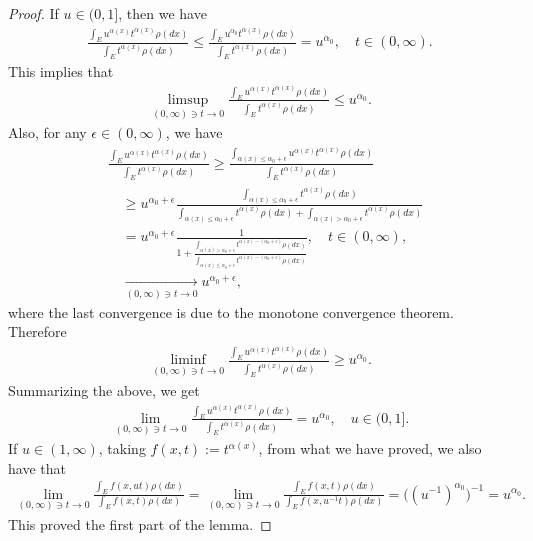 \documentclass[12pt,a4paper]{amsart}
\theoremstyle{definition}
\numberwithin{equation}{section}
\begin{document}
\begin{proof}
	If $u \in (0,1]$, then we have
  \begin{align}
    \frac{\int_E u^{\alpha(x)} t^{\alpha(x)} \rho(dx)}{\int_E t^{\alpha(x)} \rho(dx)}
    \leq \frac{\int_E u^{\alpha_0} t^{\alpha(x)} \rho(dx)}{\int_E t^{\alpha(x)} \rho(dx)}
    = u^{\alpha_0},
    \quad t\in (0,\infty).
  \end{align}
	This implies that
  \begin{align}
    \limsup_{(0,\infty) \ni t\to 0}\frac{\int_E u^{\alpha(x)} t^{\alpha(x)} \rho(dx)}{\int_E t^{\alpha(x)} \rho(dx)}	
    \leq u^{\alpha_0}.
  \end{align}
	Also, for any $\epsilon \in (0,\infty)$, we have
  \begin{align}
    &\frac{\int_E u^{\alpha(x)} t^{\alpha(x)} \rho(dx)}{\int_E t^{\alpha(x)} \rho(dx)}
      \geq \frac{ \int_{ \alpha(x) \leq  \alpha_0 + \epsilon } u^{ \alpha(x) } t^{ \alpha(x)} \rho(dx) } { \int_E t^{ \alpha(x) } \rho(dx) }
    \\&\quad \geq u^{ \alpha_0 + \epsilon} \frac{ \int_{ \alpha(x) \leq \alpha_0 + \epsilon } t^{ \alpha(x)} \rho(dx) } { \int_{ \alpha(x) \leq \alpha_0 + \epsilon}t^{\alpha(x)} \rho(dx)+ \int_{\alpha(x) > \alpha_0 + \epsilon} t^{\alpha(x)} \rho(dx)}
    \\&\quad = u^{\alpha_0 + \epsilon} \frac{1}{1+ \frac{\int_{\alpha(x) > \alpha_0 + \epsilon}t^{\alpha(x) - (\alpha_0 + \epsilon)} \rho(dx)}{\int_{\alpha(x) \leq \alpha_0 + \epsilon}t^{\alpha(x)- (\alpha_0 + \epsilon)} \rho(dx)}},
    \quad t\in (0, \infty),
    \\&\quad \xrightarrow[(0,\infty) \ni t\to 0]{}
    u^{\alpha_0 + \epsilon},
  \end{align}
	where the last convergence is due to the monotone convergence theorem.
	Therefore
  \begin{align}
    \liminf_{(0,\infty) \ni t\to 0}\frac{\int_E u^{\alpha(x)} t^{\alpha(x)} \rho(dx)}{\int_E t^{\alpha(x)} \rho(dx)}
    \geq u^{\alpha_0}.
  \end{align}
	Summarizing the above,  we get
  \begin{align}
    \lim_{(0,\infty) \ni t\to 0}\frac{\int_E u^{\alpha(x)} t^{\alpha(x)} \rho(dx)}{\int_E t^{\alpha(x)} \rho(dx)}
    = u^{\alpha_0},	
    \quad u \in (0,1].
  \end{align}
	If $u \in (1,\infty)$, taking $f(x, t):= t^{\alpha(x)}$, from what we have proved, we also have that
  \begin{align}
    \lim_{(0,\infty)\ni t\to 0}\frac{\int_E f(x,u t) \rho(dx)}{\int_E f(x, t) \rho(dx)}
    = \lim_{(0,\infty)\ni t\to 0}\frac{\int_E f(x,t) \rho(dx)}{\int_E f(x, u^{-1} t) \rho(dx)}
    = \big(( u^{-1})^{\alpha_0} \big)^{-1}
    = u^{\alpha_0}.
  \end{align}
	This proved the first part of the lemma.
	

\end{proof}
\end{document}
